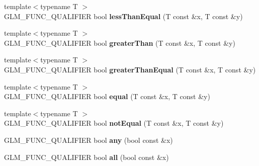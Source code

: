 \begin{DoxyCompactItemize}
\item 
\hypertarget{namespaceglm_a299eb11fb67637d37144dc0fcc6c6ff3}{{\footnotesize template$<$typename T $>$ }\\G\-L\-M\-\_\-\-F\-U\-N\-C\-\_\-\-Q\-U\-A\-L\-I\-F\-I\-E\-R bool {\bfseries less\-Than\-Equal} (T const \&x, T const \&y)}\label{namespaceglm_a299eb11fb67637d37144dc0fcc6c6ff3}

\item 
\hypertarget{namespaceglm_ae567b870c79fb61cf069d489133eaf48}{{\footnotesize template$<$typename T $>$ }\\G\-L\-M\-\_\-\-F\-U\-N\-C\-\_\-\-Q\-U\-A\-L\-I\-F\-I\-E\-R bool {\bfseries greater\-Than} (T const \&x, T const \&y)}\label{namespaceglm_ae567b870c79fb61cf069d489133eaf48}

\item 
\hypertarget{namespaceglm_a03e93d49cec76267c3e11fd68381639a}{{\footnotesize template$<$typename T $>$ }\\G\-L\-M\-\_\-\-F\-U\-N\-C\-\_\-\-Q\-U\-A\-L\-I\-F\-I\-E\-R bool {\bfseries greater\-Than\-Equal} (T const \&x, T const \&y)}\label{namespaceglm_a03e93d49cec76267c3e11fd68381639a}

\item 
\hypertarget{namespaceglm_a9943cfbeef0a00a2becb541e9e3818ed}{{\footnotesize template$<$typename T $>$ }\\G\-L\-M\-\_\-\-F\-U\-N\-C\-\_\-\-Q\-U\-A\-L\-I\-F\-I\-E\-R bool {\bfseries equal} (T const \&x, T const \&y)}\label{namespaceglm_a9943cfbeef0a00a2becb541e9e3818ed}

\item 
\hypertarget{namespaceglm_ab4ee9100dc2b4e41ef91ff6898f979e2}{{\footnotesize template$<$typename T $>$ }\\G\-L\-M\-\_\-\-F\-U\-N\-C\-\_\-\-Q\-U\-A\-L\-I\-F\-I\-E\-R bool {\bfseries not\-Equal} (T const \&x, T const \&y)}\label{namespaceglm_ab4ee9100dc2b4e41ef91ff6898f979e2}

\item 
\hypertarget{namespaceglm_ad41a7e46efe59ecfa701a0d561b7e8fa}{G\-L\-M\-\_\-\-F\-U\-N\-C\-\_\-\-Q\-U\-A\-L\-I\-F\-I\-E\-R bool {\bfseries any} (bool const \&x)}\label{namespaceglm_ad41a7e46efe59ecfa701a0d561b7e8fa}

\item 
\hypertarget{namespaceglm_a55c4531f4a0de48f87a20702d96d4289}{G\-L\-M\-\_\-\-F\-U\-N\-C\-\_\-\-Q\-U\-A\-L\-I\-F\-I\-E\-R bool {\bfseries all} (bool const \&x)}\label{namespaceglm_a55c4531f4a0de48f87a20702d96d4289}


\end{DoxyCompactItemize}
